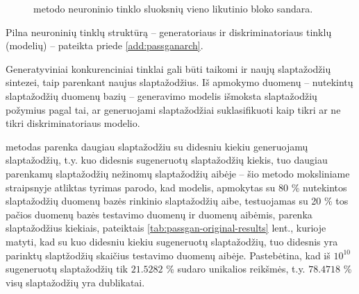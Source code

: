 \documentclass{VUMIFInfBakalaurinis}
\begin{document}
\begin{figure}[!ht]
  \begin{center}
  \end{center}
  \caption{
     metodo neuroninio tinklo sluoksnių vieno likutinio bloko 
    sandara.
  }
  \label{plot:passganblock}
\end{figure}

Pilna neuroninių tinklų struktūrą -- generatoriaus ir diskriminatoriaus tinklų 
(modelių) -- pateikta priede \ref{add:passganarch}.

Generatyviniai konkurenciniai tinklai gali būti taikomi ir naujų slaptažodžių 
sintezei, taip parenkant naujus slaptažodžius. Iš apmokymo duomenų -- nutekintų 
slaptažodžių duomenų bazių -- generavimo modelis išmoksta slaptažodžių požymius 
pagal tai, ar generuojami slaptažodžiai suklasifikuoti kaip tikri ar ne tikri 
diskriminatoriaus modelio.

 metodas parenka daugiau slaptažodžiu su didesniu kiekiu 
generuojamų slaptažodžių, t.y. kuo didesnis sugeneruotų slaptažodžių kiekis, tuo 
daugiau parenkamų slaptažodžių nežinomų slaptažodžių aibėje -- šio metodo 
moksliniame straipsnyje atliktas tyrimas parodo, kad modelis, apmokytas su 80 \% 
 nutekintos slaptažodžių duomenų bazės rinkinio slaptažodžių 
aibe, testuojamas su 20 \% tos pačios duomenų bazės testavimo duomenų ir 
 duomenų aibėmis, parenka slaptažodžius kiekiais, pateiktais 
\ref{tab:passgan-original-results} lent., kurioje matyti, kad su kuo didesniu 
kiekiu sugeneruotų slaptažodžių, tuo didesnis yra parinktų slaptžodžių skaičius 
testavimo duomenų aibėje. Pastebėtina, kad iš $10^10$ sugeneruotų slaptažodžių 
tik $21.5282$ \% sudaro unikalios reikšmės, t.y. $78.4718$ \% visų slaptažodžių 
yra dublikatai.
\end{document}
